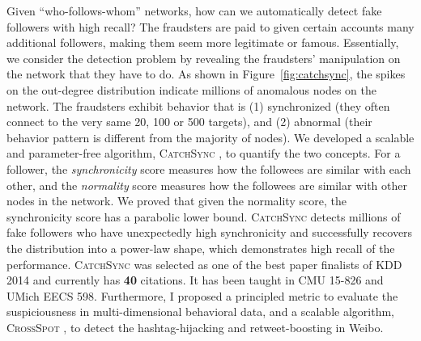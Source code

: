 \documentclass[10.5pt]{article}
\begin{document}
Given ``who-follows-whom'' networks, how can we automatically detect fake followers with high recall? The fraudsters are paid to given certain accounts many additional followers, making them seem more legitimate or famous.
Essentially, we consider the detection problem by revealing the fraudsters' manipulation on the network that they have to do. As shown in Figure~\ref{fig:catchsync}, the spikes on the out-degree distribution indicate millions of anomalous nodes on the network. The fraudsters exhibit behavior that is (1) synchronized (they often connect to the very same 20, 100 or 500 targets), and (2) abnormal (their behavior pattern is different from the majority of nodes). We developed a scalable and parameter-free algorithm, \textsc{CatchSync} \cite{jiang2014catchsync}, to quantify the two concepts. For a follower, the \emph{synchronicity} score measures how the followees are similar with each other, and the \emph{normality} score measures how the followees are similar with other nodes in the network. We proved that given the normality score, the synchronicity score has a parabolic lower bound. \textsc{CatchSync} detects millions of fake followers who have unexpectedly high synchronicity and successfully recovers the distribution into a power-law shape, which demonstrates high recall of the performance. \textsc{CatchSync} \cite{jiang2014catchsync} was selected as one of the best paper finalists of KDD 2014 and currently has \textbf{40} citations. It has been taught in CMU 15-826 and UMich EECS 598. Furthermore, I proposed a principled metric to evaluate the suspiciousness in multi-dimensional behavioral data, and a scalable algorithm, \textsc{CrossSpot} \cite{jiang2015general,jiang2016spotting}, to detect the hashtag-hijacking and retweet-boosting in Weibo.
\end{document}
